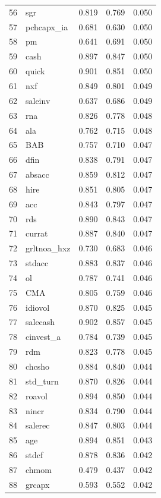 \documentclass[12pt]{article}
\begin{document}
\begin{footnotesize}
\begin{longtable}{rl|c|c|c}
		56 & sgr & 0.819 & 0.769 & 0.050 \\ 
		57 & pchcapx\_ia & 0.681 & 0.630 & 0.050 \\ 
		58 & pm & 0.641 & 0.691 & 0.050 \\ 
		59 & cash & 0.897 & 0.847 & 0.050 \\ 
		60 & quick & 0.901 & 0.851 & 0.050 \\ 
		61 & nxf & 0.849 & 0.801 & 0.049 \\ 
		62 & saleinv & 0.637 & 0.686 & 0.049 \\ 
		63 & rna & 0.826 & 0.778 & 0.048 \\ 
		64 & ala & 0.762 & 0.715 & 0.048 \\ 
		65 & BAB & 0.757 & 0.710 & 0.047 \\ 
		66 & dfin & 0.838 & 0.791 & 0.047 \\ 
		67 & absacc & 0.859 & 0.812 & 0.047 \\ 
		68 & hire & 0.851 & 0.805 & 0.047 \\ 
		69 & acc & 0.843 & 0.797 & 0.047 \\ 
		70 & rds & 0.890 & 0.843 & 0.047 \\ 
		71 & currat & 0.887 & 0.840 & 0.047 \\ 
		72 & grltnoa\_hxz & 0.730 & 0.683 & 0.046 \\ 
		73 & stdacc & 0.883 & 0.837 & 0.046 \\ 
		74 & ol & 0.787 & 0.741 & 0.046 \\ 
		75 & CMA & 0.805 & 0.759 & 0.046 \\ 
		76 & idiovol & 0.870 & 0.825 & 0.045 \\ 
		77 & salecash & 0.902 & 0.857 & 0.045 \\ 
		78 & cinvest\_a & 0.784 & 0.739 & 0.045 \\ 
		79 & rdm & 0.823 & 0.778 & 0.045 \\ 
		80 & chcsho & 0.884 & 0.840 & 0.044 \\ 
		81 & std\_turn & 0.870 & 0.826 & 0.044 \\ 
		82 & roavol & 0.894 & 0.850 & 0.044 \\ 
		83 & nincr & 0.834 & 0.790 & 0.044 \\ 
		84 & salerec & 0.847 & 0.803 & 0.044 \\ 
		85 & age & 0.894 & 0.851 & 0.043 \\ 
		86 & stdcf & 0.878 & 0.836 & 0.042 \\ 
		87 & chmom & 0.479 & 0.437 & 0.042 \\ 
		88 & grcapx & 0.593 & 0.552 & 0.042 \\ 

\end{longtable}
\end{footnotesize}
\end{document}
